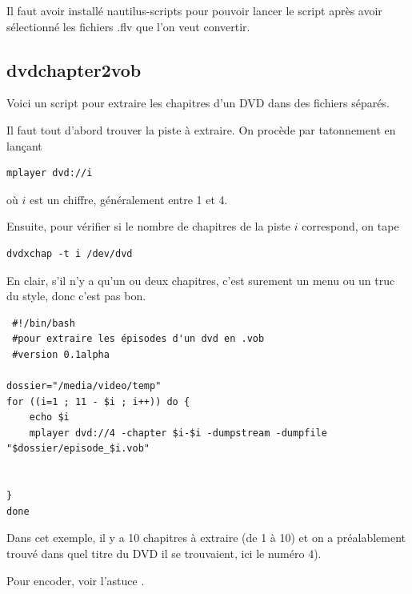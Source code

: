 \documentclass[a4paper,twoside]{article}
\begin{document}
Il faut avoir installé nautilus-scripts pour pouvoir lancer le script après avoir sélectionné les fichiers .flv que l'on veut convertir.

\subsection{dvdchapter2vob}\label{sec:dvdchapter2vob}
Voici un script pour extraire les chapitres d'un DVD dans des fichiers séparés.

Il faut tout d'abord trouver la piste à extraire. On procède par tatonnement en lançant
\begin{verbatim}
mplayer dvd://i
\end{verbatim}
où $i$ est un chiffre, généralement entre 1 et 4.

Ensuite, pour vérifier si le nombre de chapitres de la piste $i$ correspond, on tape
\begin{verbatim}
dvdxchap -t i /dev/dvd
\end{verbatim}

En clair, s'il n'y a qu'un ou deux chapitres, c'est surement un menu ou un truc du style, donc c'est pas bon.


\begin{verbatim}
 #!/bin/bash
 #pour extraire les épisodes d'un dvd en .vob
 #version 0.1alpha

dossier="/media/video/temp"
for ((i=1 ; 11 - $i ; i++)) do {
	echo $i
	mplayer dvd://4 -chapter $i-$i -dumpstream -dumpfile "$dossier/episode_$i.vob"


}
done
\end{verbatim}

Dans cet exemple, il y a 10 chapitres à extraire (de 1 à 10) et on a préalablement trouvé dans quel titre du DVD il se trouvaient, ici le numéro 4).

Pour encoder, voir l'astuce .
\end{document}
